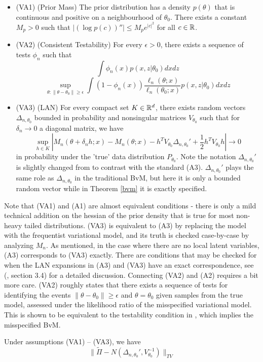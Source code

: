 \begin{itemize}
	\item (VA1) (Prior Mass) The prior distribution has a density $p(\theta)$ that is continuous and positive on a neighbourhood of $\theta_0$. There exists a constant $M_p >0$ such that $|(\log p(c))''| \leq M_p e^{|c|^2}$ for all $c \in \mathbb{R}$. 
	\item (VA2) (Consistent Testability) For every $\epsilon > 0$, there exists a sequence of tests $\phi_n$ such that 
	$$
	\int \phi_n(x)p(x, z|\theta_0)dxdz
	$$
	$$
	\sup_{\theta: \|\theta-\theta_0\| \geq \epsilon} \int (1-\phi_n(x))\frac{\ell_n(\theta;x)}{\ell_n(\theta_0; x)}p(x,z|\theta_0) dxdz
	$$
	\item (VA3) (LAN) For every compact set $K \in \mathbb{R}^d$, there exists random vectors $\Delta_{n, \theta_0}$ bounded in probability and nonsingular matrices $V_{\theta_0}$ such that for $\delta_n \to 0$ a diagonal matrix, we have
	\begin{equation}
	\sup_{h\in K} |M_n(\theta + \delta_n h; x) - M_n(\theta; x) - h^T V_{\theta_0}\Delta_{n, \theta_0}' + \frac{1}{2}h^TV_{\theta_0}h| \to 0
	\end{equation}
	in probability under the 'true' data distribution $P_{\theta_0}$. Note the notation $\Delta_{n, \theta_0}'$ is slightly changed from \cite{Wang:2019:VBVM} to contrast with the standard (A3). $\Delta_{n, \theta_0}'$ plays the same role as $\Delta_{n, \theta_0}$ in the traditional BvM, but here it is only a bounded random vector while in Theorem \ref{bvm} it is exactly specified. 
\end{itemize}
Note that (VA1) and (A1) are almost equivalent conditions - there is only a mild technical addition on the hessian of the prior density that is true for most non-heavy tailed distributions. (VA3) is equivalent to (A3) by replacing the model with the frequentist variational model, and its truth is checked case-by-case by analyzing $M_n$. As mentioned, in the case where there are no local latent variables, (A3) corresponds to (VA3) exactly. There are conditions that may be checked for when the LAN expansions in (A3) and (VA3) have an exact correspondence, see (\cite{Wang:2019:VBVM}, section 3.4) for a detailed discussion. Connecting (VA2) and (A2) requires a bit more care. (VA2) roughly states that there exists a sequence of tests for identifying the events $\|\theta-\theta_0\| \geq \epsilon$ and $\theta = \theta_0$ given samples from the true model, assessed under the likelihood ratio of the misspecified variational model. This is shown to be equivalent to the testability condition in \cite{kleijn2012}, which implies the misspecified BvM. 
\begin{lemma}
	\label{lem1}
	Under assumptions (VA1) -- (VA3), we have
	\begin{equation*}
		\|\tilde{\Pi} - N(\Delta_{n, \theta_0}', V^{-1}_{\theta_0}) \|_{TV}
	\end{equation*}
\end{lemma}

